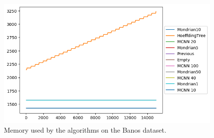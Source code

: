 \begin{figure}[H]
	\includegraphics[width=\linewidth]{figures/memory.png}
	\caption{Memory used by the algorithms on the Banos dataset.}
\end{figure}

